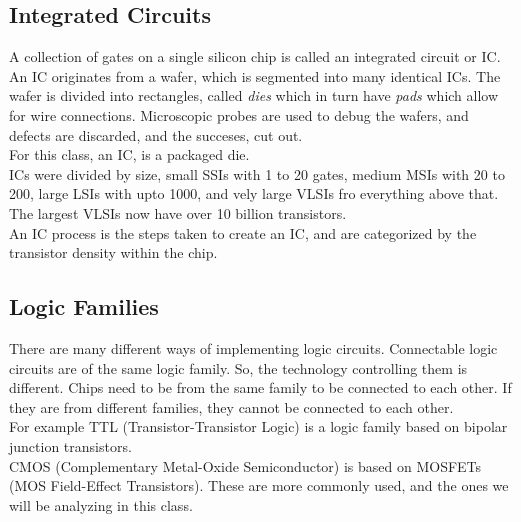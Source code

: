 \documentclass[nobib]{tufte-handout}
\begin{document}
\subsection{Integrated Circuits}
A collection of gates on a single silicon chip is called an integrated circuit
or IC.\\ An IC originates from a wafer, which is segmented into many identical
ICs. The wafer is divided into rectangles, called \textit{dies} which in turn
have \textit{pads} which allow for wire connections. Microscopic probes are
used to debug the wafers, and defects are discarded, and the succeses, cut
out.\\ For this class, an IC, is a packaged die.\\ ICs were divided by size,
small SSIs with 1 to 20 gates, medium MSIs with 20 to 200, large LSIs with upto
1000, and vely large VLSIs fro everything above that. The largest VLSIs now
have over 10 billion transistors.\\ An IC process is the steps taken to create
an IC, and are categorized by the transistor density within the chip.
\subsection{Logic Families}
There are many different ways of implementing logic circuits. Connectable logic
circuits are of the same logic family. So, the technology controlling them is
different. Chips need to be from the same family to be connected to each other.
If they are from different families, they cannot be connected to each other.\\
For example TTL (Transistor-Transistor Logic) is a logic family based on
bipolar junction transistors.\\ CMOS (Complementary Metal-Oxide Semiconductor)
is based on MOSFETs (MOS Field-Effect Transistors). These are more commonly
used, and the ones we will be analyzing in this class.\\
\end{document}
